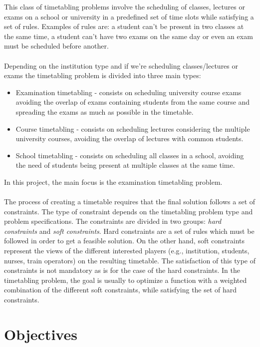 This class of timetabling problems involve the scheduling of classes, lectures or exams on a school or university in a predefined set of time slots while satisfying a set of rules. Examples of rules are: a student can't be present in two classes at the same time, a student can't have two exams on the same day or even an exam must be scheduled before another.\\
\\
Depending on the institution type and if we're scheduling classes/lectures or exams the timetabling problem is divided into three main types:\\
\begin{itemize}
	\item Examination timetabling - consists on scheduling university course exams avoiding the overlap of exams containing students from the same course and spreading the exams as much as possible in the timetable.
	\item Course timetabling - consists on scheduling lectures considering the multiple university courses, avoiding the overlap of lectures with common students.
	\item School timetabling - consists on scheduling all classes in a school, avoiding the need of students being present at multiple classes at the same time.
\end{itemize}
In this project, the main focus is the examination timetabling problem. \\
\\
The process of creating a timetable requires that the final solution follows a set of constraints. The type of constraint depends on the timetabling problem type and problem specifications. The constraints are divided in two groups: \textit{hard constraints} and \textit{soft constraints}. Hard constraints are a set of rules which must be followed in order to get a feasible solution. On the other hand, soft constraints represent the views of the different interested players (e.g., institution, students, nurses, train operators) on the resulting timetable. The satisfaction of this type of constraints is not mandatory as is for the case of the hard constraints. In the timetabling problem, the goal is usually to optimize a function with a weighted combination of the different soft constraints, while satisfying the set of hard constraints. 

\section{Objectives}
\label{section:Objts}

